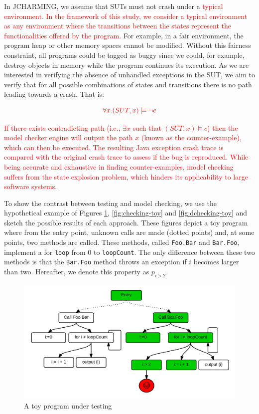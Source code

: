 \documentclass[times, doublespace]{smrauth}
\newcommand{\red}[1]{\textcolor{red}{#1}}
\begin{document}
In JCHARMING, we assume that SUTs
must not crash under a \red{typical environment.
In the framework of this study, we consider a typical environment
as any environment where the transitions between the states
represent the functionalities offered by the program.}
For example, in a fair environment, the program heap or other
memory spaces cannot be modified. Without this fairness constraint,
all programs could be tagged as buggy since we could, for example,
destroy objects in memory while the program continues its execution.
As we are interested in verifying the absence of unhandled exceptions
in the SUT, we aim to verify that for all possible combinations of
states and transitions there is no path leading towards a crash. That is:

\begin{equation}
\red{\forall x.(SUT, x) \models \neg c}
\end{equation}

\red{If there exists contradicting path (i.e., $\exists x$ such that $(SUT, x)
\models c$) then the model checker engine will output the path
$x$ (known as the counter-example), which can then be executed.
The resulting Java exception crash trace is compared with the original
crash trace to assess if the bug is reproduced.
While  being  accurate and exhaustive in finding counter-examples,
model checking suffers from the state explosion problem, which hinders
its applicability to large software systems.}


To show the contrast between testing and model checking, we use the hypothetical example of Figures \ref{fig:testing-toy}, \ref{fig:checking-toy} and \ref{fig:dchecking-toy} and sketch the possible results of each approach. These figures depict a toy program where from the entry point, unknown calls are made (dotted points) and, at some points, two methods are called. These methods, called \texttt{Foo.Bar} and \texttt{Bar.Foo}, implement a for \texttt{loop} from 0 to \texttt{loopCount}. The only difference between these two methods is that the \texttt{Bar.Foo} method throws an exception if $i$ becomes larger than two. Hereafter, we denote this property as $p_{i > 2}$.


\begin{figure}
  \centering
    \includegraphics[scale=0.7]{media/dmc.png}
    \caption{A toy program under testing
    \label{fig:testing-toy}}
\end{figure}
\end{document}
